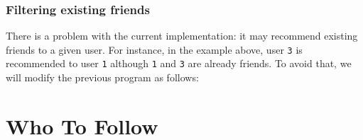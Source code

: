 \documentclass[11pt]{article}
\begin{document}

\section{Filtering existing friends}

There is a problem with the current implementation: it may recommend
existing friends to a given user. For instance, in the example above,
user \texttt{3} is recommended to user \texttt{1} although \texttt{1}
and \texttt{3} are already friends. To avoid that, we will modify the
previous program as follows:


\part{Who To Follow}
\label{part:wtf}
\end{document}
